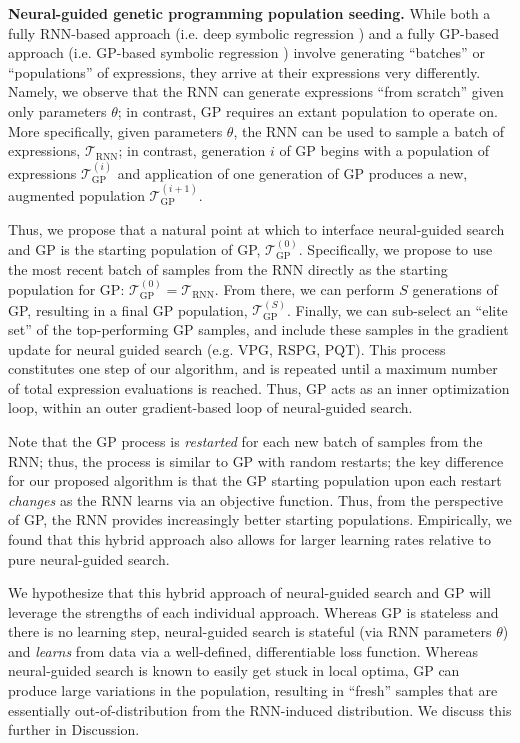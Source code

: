 \documentclass{article}
\begin{document}
\textbf{Neural-guided genetic programming population seeding.}
While both a fully RNN-based approach (i.e. deep symbolic regression \citep{petersen2019deep}) and a fully GP-based approach (i.e. GP-based symbolic regression \citep{koza1992genetic}) involve generating ``batches'' or ``populations'' of expressions, they arrive at their expressions very differently.
Namely, we observe that the RNN can generate expressions ``from scratch'' given only parameters $\theta$; in contrast, GP requires an extant population to operate on.
More specifically, given parameters $\theta$, the RNN can be used to sample a batch of expressions, $\mathcal{T}_\textrm{RNN}$; in contrast, generation $i$ of GP begins with a population of expressions $\mathcal{T}_\textrm{GP}^{(i)}$ and application of one generation of GP produces a new, augmented population $\mathcal{T}_\textrm{GP}^{(i+1)}$.

Thus, we propose that a natural point at which to interface neural-guided search and GP is the starting population of GP, $\mathcal{T}_\textrm{GP}^{(0)}$.
Specifically, we propose to use the most recent batch of samples from the RNN directly as the starting population for GP: $\mathcal{T}_\textrm{GP}^{(0)} = \mathcal{T}_\textrm{RNN}$.
From there, we can perform $S$ generations of GP, resulting in a final GP population, $\mathcal{T}_\textrm{GP}^{(S)}$.
Finally, we can sub-select an ``elite set'' of the top-performing GP samples, and include these samples in the gradient update for neural guided search (e.g. VPG, RSPG, PQT).
This process constitutes one step of our algorithm, and is repeated until a maximum number of total expression evaluations is reached.
Thus, GP acts as an inner optimization loop, within an outer gradient-based loop of neural-guided search.

Note that the GP process is \textit{restarted} for each new batch of samples from the RNN; thus, the process is similar to GP with random restarts; the key difference for our proposed algorithm is that the GP starting population upon each restart \textit{changes} as the RNN learns via an objective function.
Thus, from the perspective of GP, the RNN provides increasingly better starting populations.
Empirically, we found that this hybrid approach also allows for larger learning rates relative to pure neural-guided search.

We hypothesize that this hybrid approach of neural-guided search and GP will leverage the strengths of each individual approach.
Whereas GP is stateless and there is no learning step, neural-guided search is stateful (via RNN parameters $\theta$) and \textit{learns} from data via a well-defined, differentiable loss function.
Whereas neural-guided search is known to easily get stuck in local optima, GP can produce large variations in the population, resulting in ``fresh'' samples that are essentially out-of-distribution from the RNN-induced distribution.
We discuss this further in Discussion.
\end{document}
